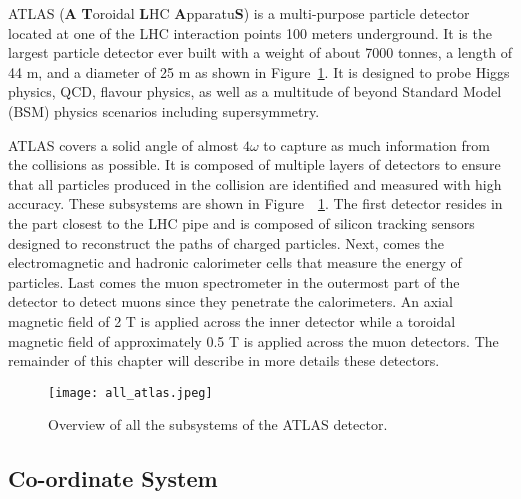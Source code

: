 ATLAS (\textbf{A} \textbf{T}oroidal \textbf{L}HC \textbf{A}pparatu\textbf{S}) is a 
multi-purpose particle detector located at one of the 
LHC interaction points 100 meters underground. 
It is the largest particle detector ever built with a weight of about 7000 tonnes, a length of 44 m, 
and a diameter of 25 m as shown in Figure~\ref{fig:exp.atlas.atlas}.
It is designed to probe Higgs physics, QCD, flavour physics, as well as a multitude of beyond Standard Model (BSM) physics scenarios including supersymmetry.

ATLAS covers a solid angle of almost $4\omega$ to capture as much information from the collisions 
as possible. 
It is composed of multiple layers of detectors to ensure that all particles produced in the 
collision are identified and measured with high accuracy.
These subsystems are shown in Figure~~\ref{fig:exp.atlas.atlas}.
The first detector resides in the part closest to the
LHC pipe and is composed of silicon tracking sensors designed to reconstruct the paths
of charged particles. 
Next, comes the electromagnetic and hadronic calorimeter cells that 
measure the energy of particles. Last comes the muon spectrometer in the outermost part of the 
detector to detect muons since they penetrate the calorimeters. 
An axial magnetic field of 2 T is applied across the inner detector while a toroidal magnetic field 
of approximately 0.5 T is applied across the muon detectors.
The remainder of this chapter will describe in more details these detectors.




\begin{figure}[t!]
\centering
\texttt{[image: all\_atlas.jpeg]}
\caption{Overview of all the subsystems of the ATLAS detector.}%
\label{fig:exp.atlas.atlas}
\end{figure} 




\subsection{Co-ordinate System}

